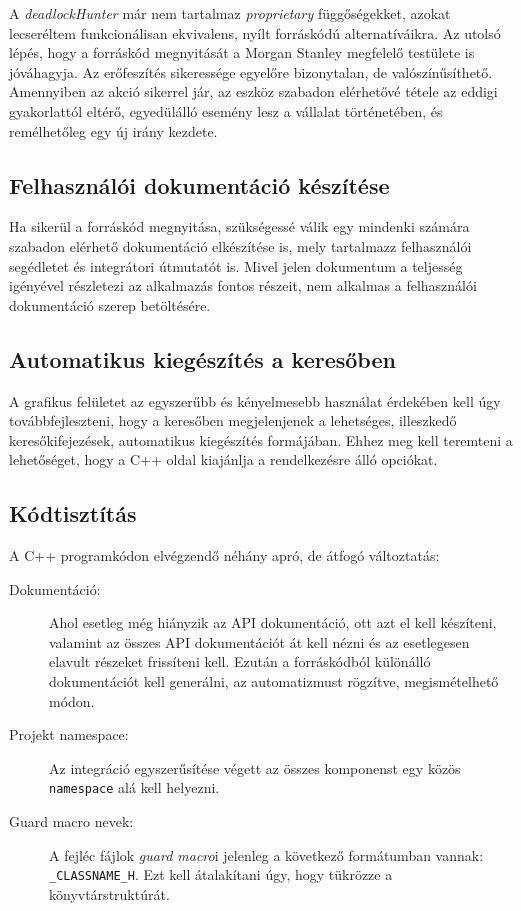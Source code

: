     A \emph{deadlockHunter} már nem tartalmaz \emph{proprietary} függőségekket, azokat lecseréltem funkcionálisan ekvivalens, nyílt forráskódú alternatíváikra. Az utolsó lépés, hogy a forráskód megnyitását a Morgan Stanley megfelelő testülete is jóváhagyja. Az erőfeszítés sikeressége egyelőre bizonytalan, de valószínűsíthető. Amennyiben az akció sikerrel jár, az eszköz szabadon elérhetővé tétele az eddigi gyakorlattól eltérő, egyedülálló esemény lesz a vállalat történetében, és remélhetőleg egy új irány kezdete.
    
    \subsection{Felhasználói dokumentáció készítése}
    Ha sikerül a forráskód megnyitása, szükségessé válik egy mindenki számára szabadon elérhető dokumentáció elkészítése is, mely tartalmazz felhasználói segédletet és integrátori útmutatót is. Mivel jelen dokumentum a teljesség igényével részletezi az alkalmazás fontos részeit, nem alkalmas a felhasználói dokumentáció szerep betöltésére.
    
    \subsection{Automatikus kiegészítés a keresőben}
    A grafikus felületet az egyszerűbb és kényelmesebb használat érdekében kell úgy továbbfejleszteni, hogy a keresőben megjelenjenek a lehetséges, illeszkedő keresőkifejezések, automatikus kiegészítés formájában. Ehhez meg kell teremteni a lehetőséget, hogy a C++ oldal kiajánlja a rendelkezésre álló opciókat.
    
    \subsection{Kódtisztítás}
    A C++ programkódon elvégzendő néhány apró, de átfogó változtatás:

    \begin{description}
        \item[Dokumentáció:] Ahol esetleg még hiányzik az API dokumentáció, ott azt el kell készíteni, valamint az összes API dokumentációt át kell nézni és az esetlegesen elavult részeket frissíteni kell. Ezután a forráskódból különálló dokumentációt kell generálni, az automatizmust rögzítve, megismételhető módon.
        
        \item[Projekt namespace:] Az integráció egyszerűsítése végett az összes komponenst egy közös \texttt{namespace} alá kell helyezni.
        
        \item[Guard macro nevek:] A fejléc fájlok \emph{guard macro}i jelenleg a következő formátumban vannak: \texttt{\_CLASSNAME\_H}. Ezt kell átalakítani úgy, hogy tükrözze a könyvtárstruktúrát.

    \end{description}

